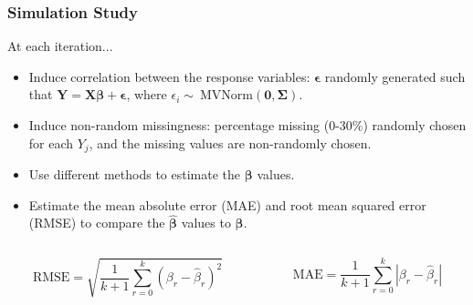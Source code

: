 \documentclass{beamer}
\begin{document}
\begin{frame}
\frametitle{Simulation Study}
\footnotesize
At each iteration...
\begin{itemize}
\item Induce correlation between the response variables: $\boldsymbol{\epsilon}$ randomly generated such that $\mathbf{Y}=\mathbf{X}\boldsymbol{\beta}+\boldsymbol{\epsilon}$, where $\epsilon_i \sim\ \text{MVNorm}(\mathbf{0},\boldsymbol{\Sigma})$.
\item Induce non-random missingness: percentage missing (0-30\%) randomly chosen for each $Y_j$, and the missing values are non-randomly chosen.
\item Use different methods to estimate the $\boldsymbol{\beta}$ values.
\item Estimate the mean absolute error (MAE) and root mean squared error (RMSE) to compare the $\boldsymbol{\hat{\beta}}$ values to $\boldsymbol{\beta}$.
\end{itemize}
\begin{columns}
	\begin{column}{0.51\textwidth}
\begin{equation}
\text{RMSE} = \sqrt{\frac{1}{k+1}\sum_{r=0}^{k} (\beta_r - \hat{\beta}_r)^2 }
\end{equation}
	\end{column}
	\begin{column}{0.45\textwidth}
\begin{equation}
\text{MAE} = \frac{1}{k+1}\sum_{r=0}^{k} |\beta_r - \hat{\beta}_r|
\end{equation}
	\end{column}
\end{columns}
\end{frame}
\end{document}
